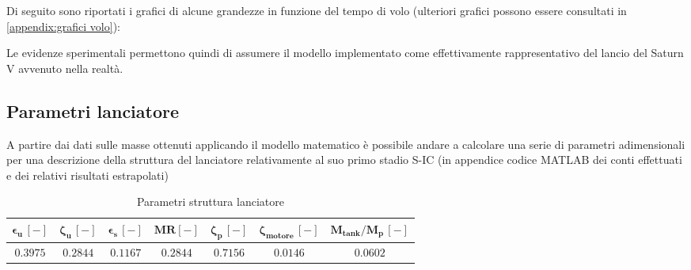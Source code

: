 Di seguito sono riportati i grafici di alcune grandezze in funzione del tempo di volo (ulteriori grafici possono essere consultati in \autoref{appendix:grafici volo}):



Le evidenze sperimentali permettono quindi di assumere il modello implementato come effettivamente rappresentativo del lancio del Saturn V avvenuto nella realtà.

\subsection{Parametri lanciatore}
\label{subsec:parametri primo stadio}
A partire dai dati sulle masse ottenuti applicando il modello matematico è possibile andare a calcolare una serie di parametri adimensionali per una descrizione della struttura del lanciatore relativamente al suo primo stadio S-IC (in appendice codice MATLAB dei conti effettuati e dei relativi risultati estrapolati)

\begin{table}[H]
\centering
\begin{tabular}{|c|c|c|c|c|c|c|}
\hline
$\bm{\epsilon_u \, [-]}$ & $\bm{\zeta_u \, [-]}$ & $\bm{\epsilon_s \, [-]}$ & $\bm{MR [-]}$ & $\bm{\zeta_p \, [-]}$ & $\bm{\zeta_{motore} \, [-]}$ & $\bm{M_{tank}/M_p \, [-]}$  \\
\hline
$0.3975$ & $0.2844$ & $0.1167$ &  $0.2844$ & $0.7156$ & $0.0146$ & $0.0602$  \\
\hline
\end{tabular}

\caption{Parametri struttura lanciatore}
\label{table: structural performance data}
\end{table}

